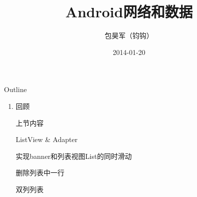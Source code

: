 \documentclass[presentation,dvipdfmx,CJKbookmarks]{beamer}
\author{包昊军（钧钩）}
\date{2014-01-20}
\title{Android网络和数据}
\begin{document}
\begin{CJK*}{UTF8}{simsun}

\maketitle
\begin{frame}{Outline}
\tableofcontents
\end{frame}

\CJKtilde

\begin{enumerate}
\item 回顾
\label{sec:org5aae1b3}

\begin{frame}[label={sec:org939d671}]{上节内容}
\begin{block}{ListView \& Adapter}
\end{block}
\begin{block}{实现banner和列表视图List的同时滑动}
\end{block}
\begin{block}{删除列表中一行}
\end{block}
\begin{block}{双列列表}
\end{block}
\end{frame}


\end{enumerate}
\end{CJK*}
\end{document}
